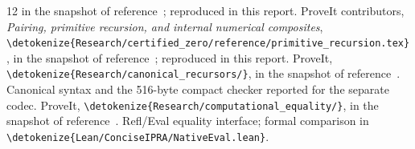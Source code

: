 \documentclass[11pt]{article}
\theoremstyle{definition}
\newcommand{\file}[1]{\expandafter\nolinkurl\expandafter{\detokenize{#1}}}
\begin{document}
\begin{thebibliography}{12}
in the snapshot of reference~\cite{baseline}; reproduced in this report.
 ProveIt contributors, \emph{Pairing, primitive recursion,
and internal numerical composites},
\file{Research/certified_zero/reference/primitive_recursion.tex},
in the snapshot of reference~\cite{baseline}; reproduced in this report.
 ProveIt, \file{Research/canonical_recursors/},
in the snapshot of reference~\cite{baseline}. Canonical syntax and the
516-byte compact checker reported for the separate codec.
 ProveIt, \file{Research/computational_equality/},
in the snapshot of reference~\cite{baseline}. Refl/Eval equality interface;
formal comparison in \file{Lean/ConciseIPRA/NativeEval.lean}.
\end{thebibliography}
\end{document}
